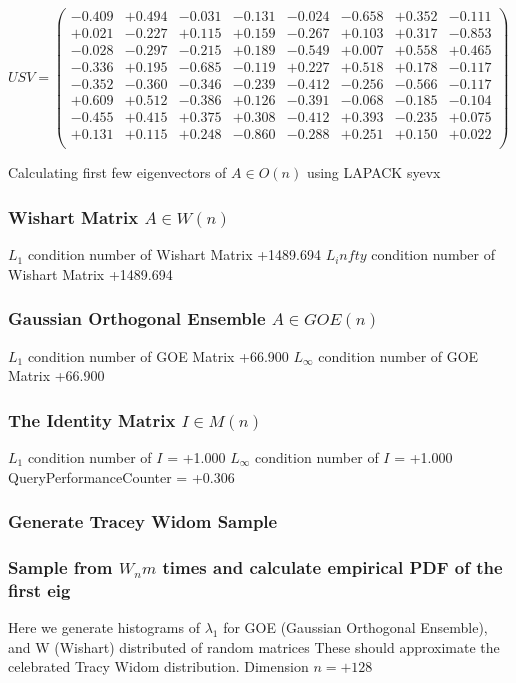 \documentclass[9pt]{article}
\theoremstyle{plain}
\theoremstyle{definition}
\theoremstyle{remark}
\numberwithin{equation}{section}
\begin{document}
$U S V = \left(
\begin{array}{
cccccccc}
-0.409 & +0.494 & -0.031 & -0.131 & -0.024 & -0.658 & +0.352 & -0.111 \\
+0.021 & -0.227 & +0.115 & +0.159 & -0.267 & +0.103 & +0.317 & -0.853 \\
-0.028 & -0.297 & -0.215 & +0.189 & -0.549 & +0.007 & +0.558 & +0.465 \\
-0.336 & +0.195 & -0.685 & -0.119 & +0.227 & +0.518 & +0.178 & -0.117 \\
-0.352 & -0.360 & -0.346 & -0.239 & -0.412 & -0.256 & -0.566 & -0.117 \\
+0.609 & +0.512 & -0.386 & +0.126 & -0.391 & -0.068 & -0.185 & -0.104 \\
-0.455 & +0.415 & +0.375 & +0.308 & -0.412 & +0.393 & -0.235 & +0.075 \\
+0.131 & +0.115 & +0.248 & -0.860 & -0.288 & +0.251 & +0.150 & +0.022 \\
\end{array}
\right)$ \newline 

Calculating first few eigenvectors of $A \in O(n)$ using LAPACK syevx

\subsubsection{Wishart Matrix $A \in W(n)$}
$L_1$ condition number of Wishart Matrix +1489.694
$L_infty$ condition number of Wishart Matrix +1489.694
\subsubsection{Gaussian Orthogonal Ensemble $A \in GOE(n)$}
$L_1$ condition number of GOE Matrix +66.900
$L_\infty$ condition number of GOE Matrix +66.900
\subsubsection{The Identity Matrix $I \in M(n)$}
$L_1$ condition number of $I$ = +1.000
$L_\infty$ condition number of $I$ = +1.000
QueryPerformanceCounter  =  +0.306
\subsubsection{Generate Tracey Widom Sample}
\subsubsection{Sample from $W_n m$ times and calculate empirical PDF of the first eig}
Here we generate histograms of $\lambda_1$ for GOE (Gaussian Orthogonal Ensemble), and W (Wishart) 		 distributed of random matrices
These should approximate the celebrated Tracy Widom distribution.
Dimension $n = +128$
\end{document}
